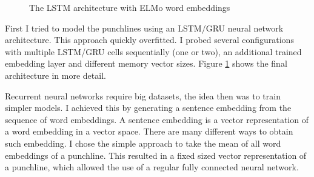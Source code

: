 \documentclass[draft,final,oneside]{vutinfth} %
\begin{document}
\begin{figure}[ht]

	
	\caption{The LSTM architecture with ELMo word embeddings}
	\label{fig:elmolstm}
\end{figure}


First I tried to model the punchlines using an LSTM/GRU neural network architecture. This approach quickly overfitted. I probed several configurations with multiple LSTM/GRU cells sequentially (one or two), an additional trained embedding layer and different memory vector sizes. Figure \ref{fig:elmolstm} shows the final architecture in more detail.

Recurrent neural networks require big datasets, the idea then was to train simpler models. I achieved this by generating a sentence embedding from the sequence of word embeddings. A sentence embedding is a vector representation of a word embedding in a vector space. There are many different ways to obtain such embedding. I chose the simple approach to take the mean of all word embeddings of a punchline. This resulted in a fixed sized vector representation of a punchline, which allowed the use of a regular fully connected neural network.
\end{document}
